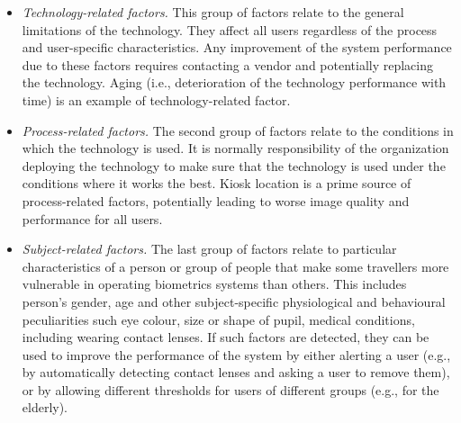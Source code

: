 \documentclass{cta-author}%
\begin{document}
\begin{itemize}
	
		\item \textit{Technology-related factors.} This group of factors relate to the general limitations of the technology. They affect all users regardless of the process and user-specific characteristics. Any improvement of the system performance due to these factors requires contacting a vendor and potentially replacing the technology. Aging 
		(i.e., deterioration of the technology performance with time) 
		is an example of technology-related factor. 

			\item \textit{Process-related factors.}  The second group of factors relate to the conditions in which the technology is used. It is normally  responsibility of the organization deploying the technology to make sure that the technology is used under the conditions where it works the best. Kiosk location is a prime source of process-related factors, potentially leading to worse image quality and performance for all users. %
			


	\item \textit{Subject-related factors.} The last group of factors relate to particular characteristics of a person or group of people that make some travellers more vulnerable in operating biometrics systems 
	than others. 
	This includes person's gender, age and  other subject-specific physiological and behavioural 	peculiarities such eye colour, size or shape of  pupil, medical conditions, including wearing contact lenses.
	If such factors are detected, they can be used to improve the performance of the system by either alerting a user (e.g.,  by automatically detecting contact lenses and asking a user to remove them), or by allowing different thresholds for users of different groups (e.g., for the elderly). 

\end{itemize}
\end{document}
